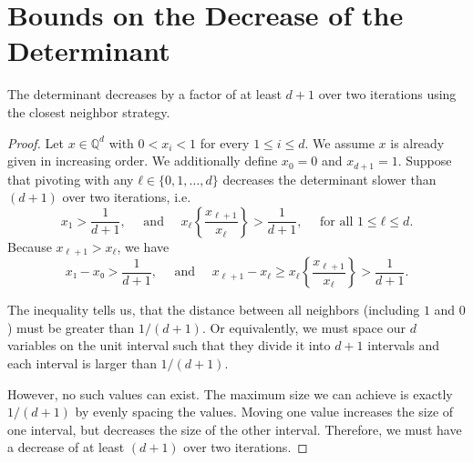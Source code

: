 \documentclass[english,version-2020-11]{uzl-thesis}
\begin{document}
\section{Bounds on the Decrease of the Determinant}

\begin{theorem}
  The determinant decreases by a factor of at least $d+1$ over two iterations
  using the closest neighbor strategy.
\end{theorem}

\begin{proof}
  Let $x ∈ ℚ^d$ with $0 < x_i < 1$ for every $1 ≤ i ≤ d$.
  We assume $x$ is already given in increasing order.
  We additionally define $x_0 = 0$ and $x_{d+1} = 1$.
  Suppose that pivoting with any $ℓ ∈ \{0, 1, \dots, d\}$
  decreases the determinant slower than $(d+1)$ over two iterations,
  i.e.
  \[
    x_1 > \frac{1}{d+1},
    \quad \text{ and } \quad
    x_\ell \left\{\frac{x_{\ell+1}}{x_\ell}\right\} > \frac{1}{d+1}, \quad \text{ for all } 1 ≤ ℓ ≤ d.
  \]
  Because $x_{\ell+1} > x_\ell$, we have
  \[
    x₁ - x₀ > \frac{1}{d+1},
    \quad \text{ and } \quad
    x_{\ell+1} - x_\ell ≥ x_\ell \left\{\frac{x_{\ell+1}}{x_\ell}\right\} > \frac{1}{d+1}.
  \]

  The inequality tells us, that the distance between all neighbors
  (including $1$ and $0$) must be greater than $1/(d+1)$.
  Or equivalently, we must space our $d$ variables on the unit interval such that they
  divide it into $d+1$ intervals and each interval is larger than $1/(d+1)$.

  {\begin{center}
  \end{center}}

  However, no such values can exist.
  The maximum size we can achieve is exactly $1/(d+1)$ by evenly
  spacing the values.
  Moving one value increases the size of one interval, but decreases the size
  of the other interval.
  Therefore, we must have a decrease of at least $(d+1)$ over two iterations.
\end{proof}
\end{document}
